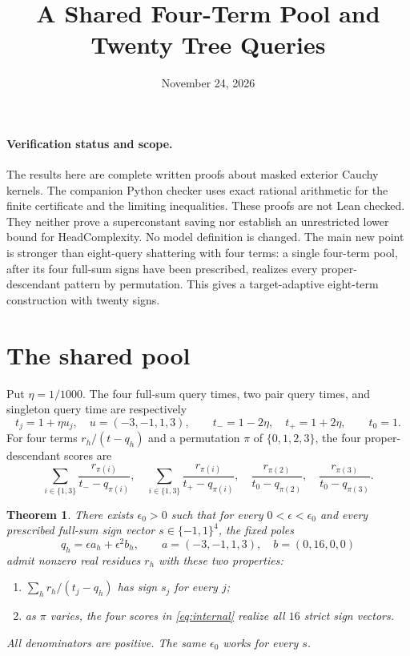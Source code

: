 \documentclass[11pt]{article}
\title{A Shared Four-Term Pool and Twenty Tree Queries}
\author{}
\date{November 24, 2026}
\newtheorem{theorem}{Theorem}
\begin{document}
\maketitle

\paragraph{Verification status and scope.}
The results here are complete written proofs about masked exterior Cauchy
kernels. The companion Python checker uses exact rational arithmetic for
the finite certificate and the limiting inequalities. These proofs are
not Lean checked. They neither prove a superconstant saving nor establish
an unrestricted lower bound for HeadComplexity. No model definition is
changed. The main new point is stronger than eight-query shattering with
four terms: a single four-term pool, after its four full-sum signs have
been prescribed, realizes every proper-descendant pattern by permutation.
This gives a target-adaptive eight-term construction with twenty signs.

\section{The shared pool}
Put $\eta=1/1000$. The four full-sum query times, two pair query times,
and singleton query time are respectively
\[
 t_j=1+\eta u_j,\quad u=(-3,-1,1,3),\qquad
 t_-=1-2\eta,\quad t_+=1+2\eta,\qquad t_0=1.
\]
For four terms $r_h/(t-q_h)$ and a permutation $\pi$ of
$\{0,1,2,3\}$, the four proper-descendant scores are
\[
 \sum_{i\in\{1,3\}}\frac{r_{\pi(i)}}{t_--q_{\pi(i)}},\quad
 \sum_{i\in\{1,3\}}\frac{r_{\pi(i)}}{t_+-q_{\pi(i)}},\quad
 \frac{r_{\pi(2)}}{t_0-q_{\pi(2)}},\quad
 \frac{r_{\pi(3)}}{t_0-q_{\pi(3)}}.
 \tag{1}\label{eq:internal}
\]

\begin{theorem}\label{thm:pool}
There exists $\epsilon_0>0$ such that for every
$0<\epsilon<\epsilon_0$ and every prescribed full-sum sign vector
$s\in\{-1,1\}^4$, the fixed poles
\[
 q_h=\epsilon a_h+\epsilon^2 b_h,\qquad
 a=(-3,-1,1,3),\quad b=(0,16,0,0)
 \tag{2}\label{eq:poles}
\]
admit nonzero real residues $r_h$ with these two properties:
\begin{enumerate}
\item $\sum_h r_h/(t_j-q_h)$ has sign $s_j$ for every $j$;
\item as $\pi$ varies, the four scores in \eqref{eq:internal}
realize all $16$ strict sign vectors.
\end{enumerate}
All denominators are positive. The same $\epsilon_0$ works for every
$s$.
\end{theorem}
\end{document}
